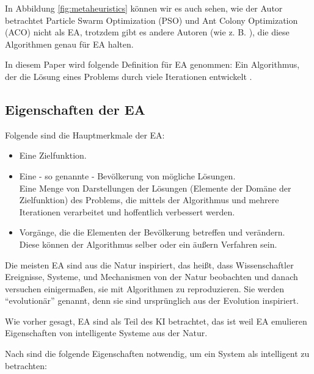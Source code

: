 \documentclass[twoside,twocolumn]{article}
\begin{document}
In Abbildung \ref{fig:metaheuristics} können wir es auch sehen, wie der Autor betrachtet Particle Swarm Optimization (PSO) und Ant Colony Optimization (ACO) nicht als EA, trotzdem gibt es andere Autoren (wie z. B. \cite{wiley_evolutionary}), die diese Algorithmen genau für EA halten.

In diesem Paper wird folgende Definition für EA genommen: Ein Algorithmus, der die Lösung eines Problems durch viele Iterationen entwickelt    .

\subsection{Eigenschaften der EA}
Folgende sind die Hauptmerkmale der EA:

\begin{itemize}
\item{Eine Zielfunktion.}\\
\item{Eine - so genannte - Bevölkerung von mögliche Lösungen.}\\
Eine Menge von Darstellungen der Lösungen (Elemente der Domäne der Zielfunktion) des Problems, die mittels der Algorithmus und mehrere Iterationen verarbeitet und hoffentlich verbessert werden.\\
\item{Vorgänge, die die Elementen der Bevölkerung betreffen und verändern.}\\
Diese können der Algorithmus selber oder ein äußern Verfahren sein.
\end{itemize}

Die meisten EA sind aus die Natur inspiriert, das heißt, dass Wissenschaftler Ereignisse, Systeme, und Mechanismen von der Natur beobachten und danach versuchen einigermaßen, sie mit Algorithmen zu reproduzieren. Sie werden \enquote{evolutionär} genannt, denn sie sind ursprünglich aus der Evolution inspiriert. \cite{holland_ga}\par

Wie vorher gesagt, EA sind als Teil des KI betrachtet, das ist weil EA emulieren Eigenschaften von intelligente Systeme aus der Natur.\par

Nach \cite{wiley_evolutionary} sind die folgende Eigenschaften notwendig, um ein System als intelligent zu betrachten:
\end{document}
